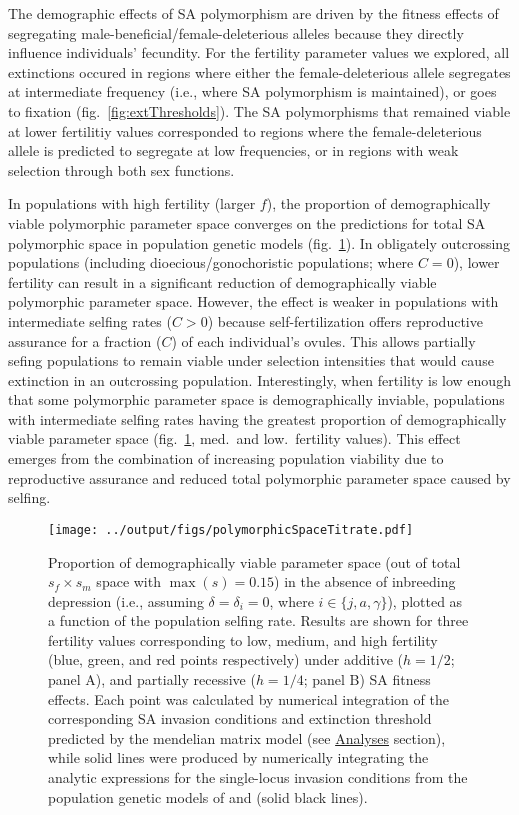 \documentclass[11pt]{article}
\begin{document}
The demographic effects of SA polymorphism are driven by the fitness effects of segregating male-beneficial/female-deleterious alleles because they directly influence individuals' fecundity. For the fertility parameter values we explored, all extinctions occured in regions where either the female-deleterious allele segregates at intermediate frequency (i.e., where SA polymorphism is maintained), or goes to fixation (fig.~\ref{fig:extThresholds}). The SA polymorphisms that remained viable at lower fertilitiy values corresponded to regions where the female-deleterious allele is predicted to segregate at low frequencies, or in regions with weak selection through both sex functions. 


In populations with high fertility (larger $f$), the proportion of demographically viable polymorphic parameter space converges on the predictions for total SA polymorphic space in population genetic models (fig.~\ref{fig:polySpace}). In obligately outcrossing populations (including dioecious/gonochoristic populations; where $C = 0$), lower fertility can result in a significant reduction of demographically viable polymorphic parameter space. However, the effect is weaker in populations with intermediate selfing rates ($C > 0$) because self-fertilization offers reproductive assurance for a fraction ($C$) of each individual's ovules. This allows partially sefing populations to remain viable under selection intensities that would cause extinction in an outcrossing population. Interestingly, when fertility is low enough that some polymorphic parameter space is demographically inviable, populations with intermediate selfing rates having the greatest proportion of demographically viable parameter space (fig.~\ref{fig:polySpace}, med.~and low.~fertility values). This effect emerges from the combination of increasing population viability due to reproductive assurance and reduced total polymorphic parameter space caused by selfing. 

 \begin{figure}[htbp]
 \centering
 \texttt{[image: ../output/figs/polymorphicSpaceTitrate.pdf]}
 \caption{\footnotesize{Proportion of demographically viable parameter space (out of total $s_f \times s_m$ space with $\max(s) = 0.15$) in the absence of inbreeding depression (i.e., assuming $\delta = \delta_i = 0$, where $i \in \{j,a,\gamma\}$), plotted as a function of the population selfing rate. Results are shown for three fertility values corresponding to low, medium, and high fertility (blue, green, and red points respectively) under additive ($h = 1/2$; panel A), and partially recessive ($h = 1/4$; panel B) SA fitness effects. Each point was calculated by numerical integration of the corresponding SA invasion conditions and extinction threshold predicted by the mendelian matrix model (see \hyperref[subsec:analyses]{Analyses} section), while solid lines were produced by numerically integrating the analytic expressions for the single-locus invasion conditions from the population genetic models of \citet{JordanConnallon2014} and \citet{Olito2017} (solid black lines).}} 
 \label{fig:polySpace}
 \end{figure}
\end{document}
